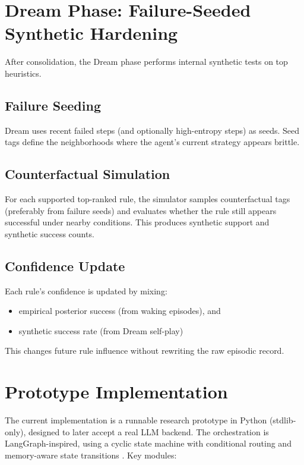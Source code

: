 \documentclass{article}
\begin{document}
\section{Dream Phase: Failure-Seeded Synthetic Hardening}

After consolidation, the Dream phase performs internal synthetic tests on top heuristics.

\subsection{Failure Seeding}

Dream uses recent failed steps (and optionally high-entropy steps) as seeds. Seed tags define the neighborhoods where the agent's current strategy appears brittle.

\subsection{Counterfactual Simulation}

For each supported top-ranked rule, the simulator samples counterfactual tags (preferably from failure seeds) and evaluates whether the rule still appears successful under nearby conditions. This produces synthetic support and synthetic success counts.

\subsection{Confidence Update}

Each rule's confidence is updated by mixing:

\begin{itemize}[leftmargin=1.25em]
\item empirical posterior success (from waking episodes), and
\item synthetic success rate (from Dream self-play)
\end{itemize}

This changes future rule influence without rewriting the raw episodic record.

\section{Prototype Implementation}

The current implementation is a runnable research prototype in Python (stdlib-only), designed to later accept a real LLM backend. The orchestration is LangGraph-inspired, using a cyclic state machine with conditional routing and memory-aware state transitions \citep{langgraph_docs}. Key modules:
\end{document}

